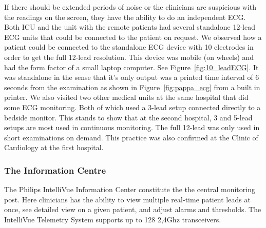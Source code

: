 If there should be extended periods of noise or the clinicians are suspicious with the readings on the screen, they have the ability to do an independent ECG. Both ICU and the unit with the remote patients had several standalone 12-lead ECG units that could be connected to the patient on request. We observed how a patient could be connected to the standalone ECG device with 10 electrodes in order to get the full 12-lead resolution. This device was mobile (on wheels) and had the form factor of a small laptop computer. See Figure~\ref{fig:10_leadECG}. It was standalone in the sense that it's only output was a printed time interval of 6 seconds from the examination as shown in Figure~\ref{fig:pappa_ecg} from a built in printer.
We also visited two other medical units at the same hospital that did some ECG monitoring. Both of which used a 3-lead setup connected directly to a bedside monitor. This stands to show that at the second hospital, 3 and 5-lead setups are most used in continuous monitoring. The full 12-lead was only used in short examinations on demand. This practice was also confirmed at the Clinic of Cardiology at the first hospital.


\subsubsection{The Information Centre} %
\label{ssub:the_information_centre}

The Philips IntelliVue Information Center constitute the the central monitoring post. Here clinicians has the ability to view multiple real-time patient leads at once, see detailed view on a given patient, and adjust alarms and thresholds. The IntelliVue Telemetry System supports up to 128 2,4Ghz transceivers.



